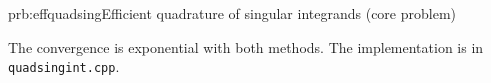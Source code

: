 \begin{samproblem}{prb:effquadsing}{Efficient quadrature of singular integrands (core problem)}
\begin{subproblem}[1]
  \cprotEnv   \begin{solution}
   The convergence is exponential with both methods. The \Cpp{} implementation is in \verb|quadsingint.cpp|.
   \end{solution}

 \end{subproblem}
\fi
 
\end{samproblem}
